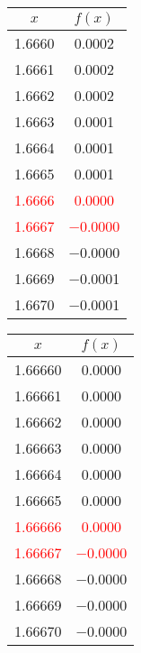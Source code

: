 \documentclass{article}
\begin{document}
\begin{enumerate}
\begin{enumerate}
            \begin{tabular}{|c|c|}
            \hline
            $x$   & $f(x)$ \\
            \hline
            \num{1,6660} & \num{0,0002} \\
            \num{1,6661} & \num{0,0002} \\
            \num{1,6662} & \num{0,0002} \\
            \num{1,6663} & \num{0,0001} \\
            \num{1,6664} & \num{0,0001} \\
            \num{1,6665} & \num{0,0001} \\
            \textcolor{red}{\num{1,6666}} & \textcolor{red}{\num{0,0000}} \\
            \textcolor{red}{\num{1,6667}} & \textcolor{red}{\num{-0,0000}} \\
            \num{1,6668} & \num{-0,0000} \\
            \num{1,6669} & \num{-0,0001} \\
            \num{1,6670} & \num{-0,0001} \\
            \hline
            \end{tabular}\quad
            \begin{tabular}{|c|c|}
            \hline
            $x$   & $f(x)$ \\
            \hline
            \num{1,66660} & \num{0,0000} \\
            \num{1,66661} & \num{0,0000} \\
            \num{1,66662} & \num{0,0000} \\
            \num{1,66663} & \num{0,0000} \\
            \num{1,66664} & \num{0,0000} \\
            \num{1,66665} & \num{0,0000} \\
            \textcolor{red}{\num{1,66666}} & \textcolor{red}{\num{0,0000}} \\
            \textcolor{red}{\num{1,66667}} & \textcolor{red}{\num{-0,0000}} \\
            \num{1,66668} & \num{-0,0000} \\
            \num{1,66669} & \num{-0,0000} \\
            \num{1,66670} & \num{-0,0000} \\
            \hline
            \end{tabular}\quad \\ 
    

\end{enumerate}
\end{enumerate}
\end{document}
